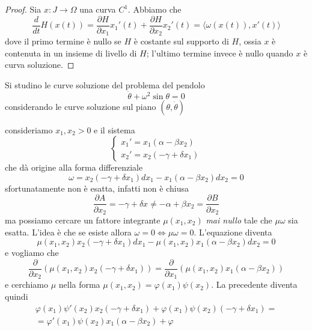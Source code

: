 \begin{proof}
    Sia \(x : J \to \Omega\) una curva \(C^{1}\). Abbiamo che
    \[
      \frac{d}{dt} H {(x{(t)})} = \frac{\partial H}{\partial x_{1}} x_{1}'{(t)}
      + \frac{\partial H}{\partial x_{2}} x_{2}'{(t)} = \langle
      \omega{(x{(t)})}, x'{(t)} \rangle
    \]
    dove il primo termine è nullo se \(H\) è costante sul supporto di \(H\),
    ossia \(x\) è contenuta in un insieme di livello di \(H\); l'ultimo termine
    invece è nullo quando \(x\) è curva soluzione.
\end{proof}
\begin{eser}
    Si studino le curve soluzione del problema del pendolo
\[
    \ddot{\theta} + \omega^2  \sin\theta = 0   
\]
    considerando le curve soluzione sul piano \((\theta, \dot{\theta})\) 
\end{eser}
\begin{example}
    consideriamo \(x_{1}, x_{2} > 0\) e il sistema
\[
    \begin{cases}
        x_{1}' = x_{1}{(\alpha - \beta x_{2})} \\
        x_{2}' = x_{2}{(-\gamma + \delta x_{1})}
    \end{cases}
\]
    che dà origine alla forma differenziale
\[
    \omega = x_{2} {(-\gamma + \delta x_{1})} dx_{1} - x_{1}{(\alpha - \beta
    x_{2})}dx_{2} = 0
\]
    sfortunatamente non è esatta, infatti non è chiusa
\[
    \frac{\partial A}{\partial x_{2}} = -\gamma + \delta x \neq -\alpha + \beta
    x_{2} = \frac{\partial B}{\partial x_{2}}
\]
    ma possiamo cercare un fattore integrante \(\mu{(x_{1}, x_{2})}\) \emph{mai
    nullo} tale che \(\mu \omega\) sia esatta. L'idea è che se esiste allora
    \(\omega = 0 \iff \mu \omega = 0\). L'equazione diventa
\[
    \mu{(x_{1}, x_{2})}x_{2} {(-\gamma + \delta x_{1})}dx_{1} - \mu{(x_{1},
    x_{2})}x_{1}{(\alpha - \beta x_{2})}dx_{2} = 0
\]
    e vogliamo che
\[
    \frac{\partial }{\partial x_{2}} {\left( \mu{(x_{1}, x_{2})} x_{2}{(-\gamma
    + \delta x_{1})} \right)} = \frac{\partial }{\partial x_{1}} {\left(
\mu{(x_{1}, x_{2})} x_{1}{(\alpha - \beta x_{2})} \right)}
\]
    e cerchiamo \(\mu\) nella forma \(\mu{(x_{1}, x_{2})} = \varphi {(x_{1})}
    \psi {(x_{2})}\). La precedente diventa quindi
\begin{align*}
    \varphi {(x_{1})} \psi'{(x_{2})} x_{2}{(-\gamma + \delta x_{1})} + \varphi
    {(x_{1})}\psi {(x_{2})} {(- \gamma + \delta x_{1})} = \\
    = \varphi'{(x_{1})}\psi {(x_{2})} x_{1}{(\alpha - \beta x_{2})} + \varphi

\end{align*}
\end{example}
